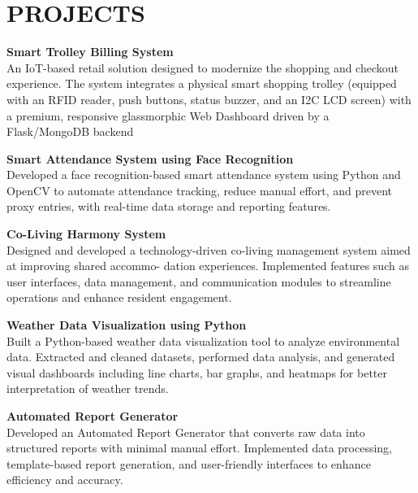 \documentclass[9.5pt,a4paper]{extarticle}
\begin{document}
\section*{PROJECTS}
\noindent \textbf{Smart Trolley Billing System} \\
An IoT-based retail solution designed to modernize the shopping and checkout experience. The system integrates a physical smart shopping trolley (equipped with an RFID reader, push buttons, status buzzer, and an I2C LCD screen) with a premium, responsive glassmorphic Web Dashboard driven by a Flask/MongoDB backend \vspace{4pt}

\noindent \textbf{Smart Attendance System using Face Recognition} \\
Developed a face recognition-based smart attendance system using Python and OpenCV to automate attendance tracking, reduce manual effort, and prevent proxy entries, with real-time data storage and reporting features. \vspace{4pt}

\noindent \textbf{Co-Living Harmony System} \\
Designed and developed a technology-driven co-living management system aimed at improving shared accommo- dation experiences. Implemented features such as user interfaces, data management, and communication modules to streamline operations and enhance resident engagement. \vspace{4pt}

\noindent \textbf{Weather Data Visualization using Python} \\
Built a Python-based weather data visualization tool to analyze environmental data. Extracted and cleaned datasets, performed data analysis, and generated visual dashboards including line charts, bar graphs, and heatmaps for better interpretation of weather trends. \vspace{4pt}

\noindent \textbf{Automated Report Generator} \\
Developed an Automated Report Generator that converts raw data into structured reports with minimal manual effort. Implemented data processing, template-based report generation, and user-friendly interfaces to enhance efficiency and accuracy. \vspace{4pt}


\end{document}
